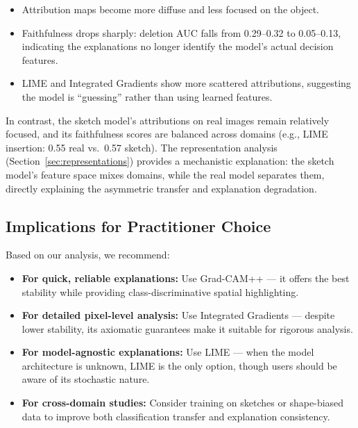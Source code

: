 \documentclass[12pt, a4paper]{article}
\begin{document}
\begin{itemize}[leftmargin=*]
    \item Attribution maps become more diffuse and less focused on the object.
    \item Faithfulness drops sharply: deletion AUC falls from 0.29--0.32 to
          0.05--0.13, indicating the explanations no longer identify the
          model's actual decision features.
    \item LIME and Integrated Gradients show more scattered attributions,
          suggesting the model is ``guessing'' rather than using learned
          features.
\end{itemize}

In contrast, the sketch model's attributions on real images remain relatively
focused, and its faithfulness scores are balanced across domains (e.g., LIME
insertion: 0.55 real vs.\ 0.57 sketch).  The representation analysis
(Section~\ref{sec:representations}) provides a mechanistic explanation: the
sketch model's feature space mixes domains, while the real model separates
them, directly explaining the asymmetric transfer and explanation degradation.

\subsection{Implications for Practitioner Choice}

Based on our analysis, we recommend:

\begin{itemize}[leftmargin=*]
    \item \textbf{For quick, reliable explanations:} Use Grad-CAM++ --- it
          offers the best stability while providing class-discriminative
          spatial highlighting.
    \item \textbf{For detailed pixel-level analysis:} Use Integrated Gradients
          --- despite lower stability, its axiomatic guarantees make it
          suitable for rigorous analysis.
    \item \textbf{For model-agnostic explanations:} Use LIME --- when the
          model architecture is unknown, LIME is the only option, though
          users should be aware of its stochastic nature.
    \item \textbf{For cross-domain studies:} Consider training on sketches or
          shape-biased data to improve both classification transfer and
          explanation consistency.
\end{itemize}
\end{document}
